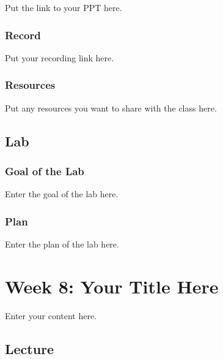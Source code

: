 \documentclass[
  letterpaper,
  oneside]{book}
\numberwithin{equation}{section}
\numberwithin{figure}{section}
\theoremstyle{break}
\begin{document}

Put the link to your PPT here.

\section*{Record}\label{record-6}


Put your recording link here.

\section*{Resources}\label{resources-6}


Put any resources you want to share with the class here.

\chapter*{Lab}\label{lab-6}


\section*{Goal of the Lab}\label{goal-of-the-lab-6}


Enter the goal of the lab here.

\section*{Plan}\label{plan-6}


Enter the plan of the lab here.

\part{Week 8: Your Title Here}

Enter your content here.

\chapter*{Lecture}\label{lecture-7}
\end{document}
